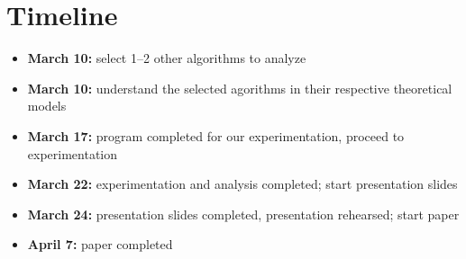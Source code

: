 \documentclass[11pt,letterpaper]{article}
\begin{document}
\section{Timeline}
\begin{itemize}
    \item \textbf{March 10:} select 1--2 other algorithms to analyze
    \item \textbf{March 10:} understand the selected agorithms in their respective theoretical models
    \item \textbf{March 17:} program completed for our experimentation, proceed to experimentation
    \item \textbf{March 22:} experimentation and analysis completed; start presentation slides
    \item \textbf{March 24:} presentation slides completed, presentation rehearsed; start paper
    \item \textbf{April 7:} paper completed 
\end{itemize}

\printbibliography%
\end{document}
